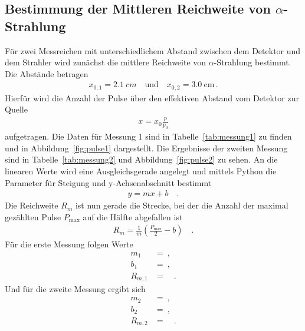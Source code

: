 \subsection{Bestimmung der Mittleren Reichweite von $\alpha$-Strahlung} \label{sec:reichweite}
Für zwei Messreichen mit unterschiedlichem Abstand zwischen dem Detektor und dem Strahler wird zunächst die mittlere Reichweite von $\alpha$-Strahlung bestimmt. Die Abstände betragen
\begin{align*}
	x_{0,1} = \SI{2,1}{cm} \quad \text{und} \quad x_{0,2} = \SI{3,0}{\centi\meter} \, .
\end{align*}
Hierfür wird die Anzahl der Pulse über den effektiven Abstand vom Detektor zur Quelle
\begin{align}
	x = x_0 \frac{p}{p_0}
\end{align}
aufgetragen. Die Daten für Messung 1 sind in Tabelle~\ref{tab:messung1} zu finden und in Abbildung~\ref{fig:pulse1} dargestellt. Die Ergebnisse der zweiten Messung sind in Tabelle~\ref{tab:messung2} und Abbildung~\ref{fig:pulse2} zu sehen.  An die linearen Werte wird eine Ausgleichsgerade angelegt und mittels Python die Parameter für Steigung und y-Achsenabschnitt bestimmt
\begin{align}
	y = mx +b \quad .
\end{align}
Die Reichweite $R_m$ ist nun gerade die Strecke, bei der die Anzahl der maximal gezählten Pulse $P_\text{max}$  auf die Hälfte abgefallen ist
\begin{align}
	R_m = \frac{1}{m} \left(\frac{P_\text{max}}{2} -b \right) \quad .
\end{align}
Für die erste Messung folgen Werte
\begin{align}
	m_1 &=  \ , \\
	b_1 &=  \ , \\
	R_{m,1} &=  \quad.
\end{align}Und für die zweite Messung ergibt sich
\begin{align}
	m_2 &=  \ , \\
	b_2 &=  \ , \\
	R_{m,2} &=  \quad.
\end{align}


